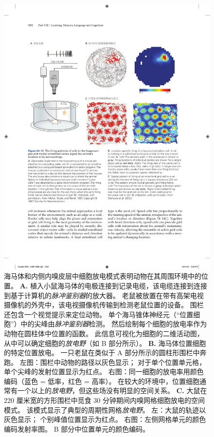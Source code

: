 \begin{figure}[htbp]
	\centering
	\includegraphics[width=0.95\linewidth]{chap54/fig_54_12}
	\caption{海马体和内侧内嗅皮层中细胞放电模式表明动物在其周围环境中的位置。
		\textbf{A.} 植入小鼠海马体的电极连接到记录电缆，该电缆连接到连接到基于计算机的\textit{脉冲鉴别器}的放大器。
		老鼠被放置在带有高架电视摄像机的外壳中，该电视摄像机传输到检测老鼠位置的设备。
		围栏还包含一个视觉提示来定位动物。
		单个海马锥体神经元（“位置细胞”）中的尖峰由\textit{脉冲鉴别器}检测。
		然后绘制每个细胞的放电率作为动物在圆柱体中位置的函数。
		此信息可视化为细胞的二维活动图，从中可以确定细胞的\textit{放电野}（如 B 部分所示）\cite{muller1987spatial}。
		\textbf{B.} 海马体位置细胞的特定位置放电。
		一只老鼠在类似于 A 部分所示的圆柱形围栏中奔跑。
		左图：围栏中动物的路径以灰色显示；
		对于单个位置单元格，单个尖峰的发射位置显示为红点。
		右图：同一细胞的放电率用颜色编码（蓝色 = 低率，红色 = 高率）。
		在较大的环境中，位置细胞通常有一个以上的\textit{放电野}，但这些场没有明显的空间关系。
		\textbf{C.} 大鼠在 220 厘米宽的方形围栏中觅食 30 分钟期间内嗅网格细胞放电的空间模式。
		该模式显示了典型的周期性网格\textit{放电野}。
		左：大鼠的轨迹以灰色显示；
		个别峰值位置显示为红点。
		右图：左侧网格单元的颜色编码发射率图。
		B 部分中位置单元的颜色编码\cite{stensola2012entorhinal}。}
	\label{fig:54_12}
\end{figure}


